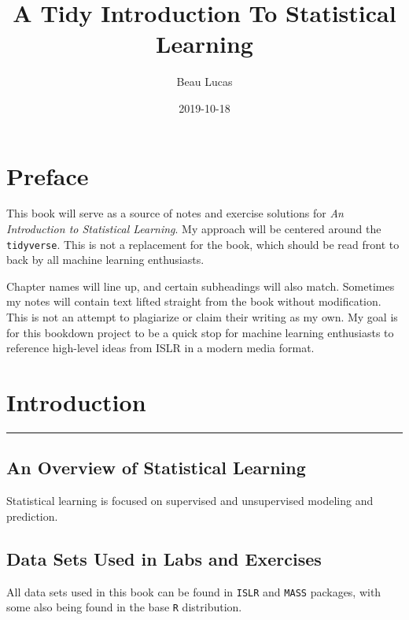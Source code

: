 \documentclass[]{book}
\title{A Tidy Introduction To Statistical Learning}
\author{Beau Lucas}
\date{2019-10-18}
\begin{document}
\maketitle

{
\setcounter{tocdepth}{1}
\tableofcontents
}
\hypertarget{preface}{%
\chapter*{Preface}\label{preface}}

This book will serve as a source of notes and exercise solutions for \emph{An Introduction to Statistical Learning}. My approach will be centered around the \texttt{tidyverse}. This is not a replacement for the book, which should be read front to back by all machine learning enthusiasts.

Chapter names will line up, and certain subheadings will also match. Sometimes my notes will contain text lifted straight from the book without modification. This is not an attempt to plagiarize or claim their writing as my own. My goal is for this bookdown project to be a quick stop for machine learning enthusiasts to reference high-level ideas from ISLR in a modern media format.

\hypertarget{intro}{%
\chapter{Introduction}\label{intro}}

\begin{center}\rule{0.5\linewidth}{\linethickness}\end{center}

\hypertarget{an-overview-of-statistical-learning}{%
\section{An Overview of Statistical Learning}\label{an-overview-of-statistical-learning}}

Statistical learning is focused on supervised and unsupervised modeling and prediction.

\hypertarget{data-sets-used-in-labs-and-exercises}{%
\section{Data Sets Used in Labs and Exercises}\label{data-sets-used-in-labs-and-exercises}}

All data sets used in this book can be found in \texttt{ISLR} and \texttt{MASS} packages, with some also being found in the base \texttt{R} distribution.
\end{document}

